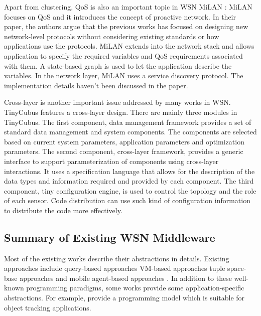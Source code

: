 Apart from clustering, QoS is also an important topic in WSN MiLAN \cite{milan}: MiLAN focuses on QoS and it introduces the concept of proactive network. In their paper, the authors argue that the previous works has focused on designing new network-level protocols without considering existing standards or how applications use the protocols. MiLAN extends into the network stack and allows application to specify the required variables and QoS requirements associated with them. A state-based graph is used to let the application describe the variables. In the network layer, MiLAN uses a service discovery protocol. The implementation details haven't been discussed in the paper.

Cross-layer is another important issue addressed by many works in WSN. TinyCubus \cite{tinycubus} features a cross-layer design. There are mainly three modules in TinyCubus. The first component, data management framework provides a set of standard data management and system components. The components are selected based on current system parameters, application parameters and optimization parameters. The second component, cross-layer framework, provides a generic interface to support parameterization of components using cross-layer interactions. It uses a specification language that allows for the description of the data types and information required and provided by each component. The third component, tiny configuration engine, is used to control the topology and the role of each sensor. Code distribution can use such kind of configuration information to distribute the code more effectively.

\subsection{Summary of Existing WSN Middleware}
Most of the existing works describe their abstractions in details. Existing approaches include query-based approaches \cite{cougar, sina, tinydb} VM-based approaches \cite{magnetos, mate, smartmessage} tuple space-base approaches \cite{tinylime} and mobile agent-based approaches \cite{agilla, sensorware}. In addition to these well-known programming paradigms, some works provide some application-specific abstractions. For example, \cite{envirotrack} provide a programming model which is suitable for object tracking applications.

